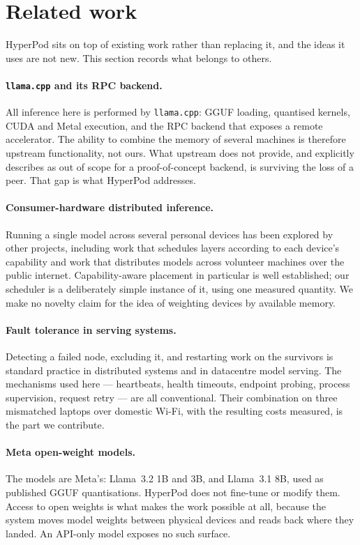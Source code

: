 \section{Related work}
\label{sec:related}

HyperPod sits on top of existing work rather than replacing it, and the ideas it
uses are not new. This section records what belongs to others.

\paragraph{\texttt{llama.cpp} and its RPC backend.}
All inference here is performed by \texttt{llama.cpp}: GGUF loading,
quantised kernels, CUDA and Metal execution, and the RPC backend that exposes a
remote accelerator. The ability to combine the memory of several machines is
therefore upstream functionality, not ours. What upstream does not provide, and
explicitly describes as out of scope for a proof-of-concept backend, is
surviving the loss of a peer. That gap is what HyperPod addresses.

\paragraph{Consumer-hardware distributed inference.}
Running a single model across several personal devices has been explored by
other projects, including work that schedules layers according to each device's
capability and work that distributes models across volunteer machines over the
public internet. Capability-aware placement in particular is well established;
our scheduler is a deliberately simple instance of it, using one measured
quantity. We make no novelty claim for the idea of weighting devices by
available memory.

\paragraph{Fault tolerance in serving systems.}
Detecting a failed node, excluding it, and restarting work on the survivors is
standard practice in distributed systems and in datacentre model serving. The
mechanisms used here --- heartbeats, health timeouts, endpoint probing, process
supervision, request retry --- are all conventional. Their combination on three
mismatched laptops over domestic Wi-Fi, with the resulting costs measured, is
the part we contribute.

\paragraph{Meta open-weight models.}
The models are Meta's: Llama~3.2 1B and 3B, and Llama~3.1 8B, used as published
GGUF quantisations. HyperPod does not fine-tune or modify them. Access to
open weights is what makes the work possible at all, because the system moves
model weights between physical devices and reads back where they landed. An
API-only model exposes no such surface.

